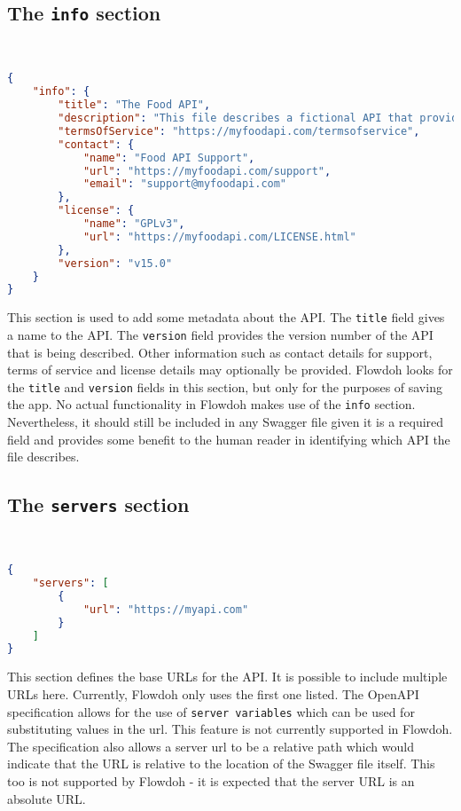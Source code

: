 \subsection{The \texttt{info} section}
\hfill\\
\begin{minipage}{\textwidth}
\begin{lstlisting}[caption={A fully populated \texttt{info} section},label={code:info_section},language=json]
{
    "info": {
        "title": "The Food API",
        "description": "This file describes a fictional API that provides details about food items",
        "termsOfService": "https://myfoodapi.com/termsofservice",
        "contact": {
            "name": "Food API Support",
            "url": "https://myfoodapi.com/support",
            "email": "support@myfoodapi.com"
        },
        "license": {
            "name": "GPLv3",
            "url": "https://myfoodapi.com/LICENSE.html"
        },
        "version": "v15.0"
    }
}
\end{lstlisting}
\end{minipage}
This section is used to add some metadata about the API. The \texttt{title} field gives a name to the API. The \texttt{version} field provides the version number of the API that is being described. Other information such as contact details for support, terms of service and license details may optionally be provided. Flowdoh looks for the \texttt{title} and \texttt{version} fields in this section, but only for the purposes of saving the app. No actual functionality in Flowdoh makes use of the \texttt{info} section. Nevertheless, it should still be included in any Swagger file given it is a required field and provides some benefit to the human reader in identifying which API the file describes.
\subsection{The \texttt{servers} section}
\hfill\\
\begin{minipage}{\textwidth}
\begin{lstlisting}[caption={A URL defined in the \texttt{servers} section},label={code:servers},language=json]
{
    "servers": [
        {
            "url": "https://myapi.com"
        }
    ]
}
\end{lstlisting}
\end{minipage}
This section defines the base URLs for the API. It is possible to include multiple URLs here. Currently, Flowdoh only uses the first one listed. The OpenAPI specification allows for the use of \texttt{server variables} \cite{servervariables} which can be used for substituting values in the url. This feature is not currently supported in Flowdoh. The specification also allows a server url to be a relative path which would indicate that the URL is relative to the location of the Swagger file itself. This too is not supported by Flowdoh - it is expected that the server URL is an absolute URL.

